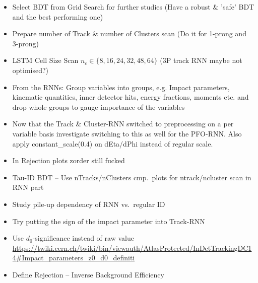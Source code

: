 \begin{itemize}
\item Select BDT from Grid Search for further studies (Have a robust \& 'safe'
  BDT and the best performing one)
\item Prepare number of Track \& number of Clusters scan (Do it for 1-prong and
  3-prong)
\item LSTM Cell Size Scan $n_c \in \{8, 16, 24, 32, 48, 64\}$ (3P track RNN
  maybe not optimised?)
\item From the RNNs: Group variables into groups, e.g. Impact parameters,
  kinematic quantities, inner detector hits, energy fractions, moments etc. and
  drop whole groups to gauge importance of the variables
\item Now that the Track \& Cluster-RNN switched to preprocessing on a per
  variable basis investigate switching to this as well for the PFO-RNN. Also
  apply constant\_scale(0.4) on dEta/dPhi instead of regular scale.
\item In Rejection plots zorder still fucked
\item Tau-ID BDT -- Use nTracks/nClusters cmp.\ plots for ntrack/ncluster scan
  in RNN part
\item Study pile-up dependency of RNN vs.\ regular ID
\item Try putting the sign of the impact parameter into Track-RNN
\item Use $d_0$-significance instead of raw value
  \url{https://twiki.cern.ch/twiki/bin/viewauth/AtlasProtected/InDetTrackingDC14#Impact_parameters_z0_d0_definiti}
\item Define Rejection -- Inverse Background Efficiency
\end{itemize}


